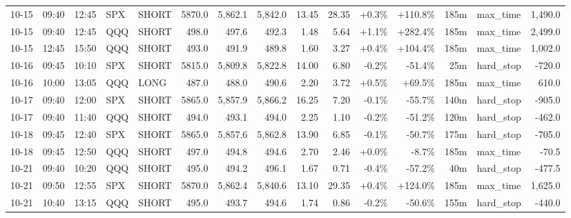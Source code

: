 \documentclass[11pt,a4paper,twoside]{article}
\begin{document}
\begin{landscape}
\begin{center}
\begin{longtable}{>{\color{txtmain}}l l l l l r r r r r r r r >{\color{txtmain}}l r}
10-15 & 09:40 & 12:45 & SPX & SHORT & 5870.0 & 5,862.1 & 5,842.0 & 13.45 & 28.35 & \textcolor{wingreen}{+0.3\%} & \textcolor{wingreen}{+110.8\%} & 185m & max\_time & \textcolor{wingreen}{1,490.0} \\
10-15 & 09:40 & 12:45 & QQQ & SHORT & 498.0 & 497.6 & 492.3 & 1.48 & 5.64 & \textcolor{wingreen}{+1.1\%} & \textcolor{wingreen}{+282.4\%} & 185m & max\_time & \textcolor{wingreen}{2,499.0} \\
10-15 & 12:45 & 15:50 & QQQ & SHORT & 493.0 & 491.9 & 489.8 & 1.60 & 3.27 & \textcolor{wingreen}{+0.4\%} & \textcolor{wingreen}{+104.4\%} & 185m & max\_time & \textcolor{wingreen}{1,002.0} \\
10-16 & 09:45 & 10:10 & SPX & SHORT & 5815.0 & 5,809.8 & 5,822.8 & 14.00 & 6.80 & \textcolor{lossred}{-0.2\%} & \textcolor{lossred}{-51.4\%} & 25m & hard\_stop & \textcolor{lossred}{-720.0} \\
10-16 & 10:00 & 13:05 & QQQ & LONG & 487.0 & 488.0 & 490.6 & 2.20 & 3.72 & \textcolor{wingreen}{+0.5\%} & \textcolor{wingreen}{+69.5\%} & 185m & max\_time & \textcolor{wingreen}{610.0} \\
10-17 & 09:40 & 12:00 & SPX & SHORT & 5865.0 & 5,857.9 & 5,866.2 & 16.25 & 7.20 & \textcolor{lossred}{-0.1\%} & \textcolor{lossred}{-55.7\%} & 140m & hard\_stop & \textcolor{lossred}{-905.0} \\
10-17 & 09:40 & 11:40 & QQQ & SHORT & 494.0 & 493.1 & 494.0 & 2.25 & 1.10 & \textcolor{lossred}{-0.2\%} & \textcolor{lossred}{-51.2\%} & 120m & hard\_stop & \textcolor{lossred}{-462.0} \\
10-18 & 09:45 & 12:40 & SPX & SHORT & 5865.0 & 5,857.6 & 5,862.8 & 13.90 & 6.85 & \textcolor{lossred}{-0.1\%} & \textcolor{lossred}{-50.7\%} & 175m & hard\_stop & \textcolor{lossred}{-705.0} \\
10-18 & 09:45 & 12:50 & QQQ & SHORT & 497.0 & 494.8 & 494.6 & 2.70 & 2.46 & \textcolor{wingreen}{+0.0\%} & \textcolor{lossred}{-8.7\%} & 185m & max\_time & \textcolor{lossred}{-70.5} \\
10-21 & 09:40 & 10:20 & QQQ & SHORT & 495.0 & 494.2 & 496.1 & 1.67 & 0.71 & \textcolor{lossred}{-0.4\%} & \textcolor{lossred}{-57.2\%} & 40m & hard\_stop & \textcolor{lossred}{-477.5} \\
10-21 & 09:50 & 12:55 & SPX & SHORT & 5870.0 & 5,862.4 & 5,840.6 & 13.10 & 29.35 & \textcolor{wingreen}{+0.4\%} & \textcolor{wingreen}{+124.0\%} & 185m & max\_time & \textcolor{wingreen}{1,625.0} \\
10-21 & 10:40 & 13:15 & QQQ & SHORT & 495.0 & 493.7 & 494.6 & 1.74 & 0.86 & \textcolor{lossred}{-0.2\%} & \textcolor{lossred}{-50.6\%} & 155m & hard\_stop & \textcolor{lossred}{-440.0} \\

\end{longtable}
\end{center}
\end{landscape}
\end{document}
